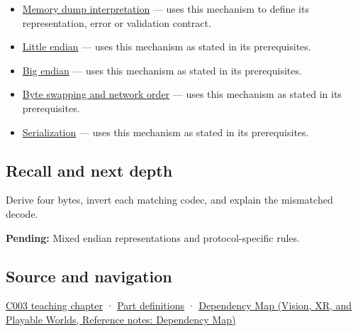 \hypertarget{appendix-bc07c3d25b18-used-by}{}

\begin{itemize}
\item
  \hyperref[appendix-230b59c0676b]{Memory dump interpretation} --- uses this mechanism to define its representation, error or validation contract.
\item
  \hyperref[appendix-367b6abf460e]{Little endian} --- uses this mechanism as stated in its prerequisites.
\item
  \hyperref[appendix-92e040df969a]{Big endian} --- uses this mechanism as stated in its prerequisites.
\item
  \hyperref[appendix-11ba36693aa2]{Byte swapping and network order} --- uses this mechanism as stated in its prerequisites.
\item
  \hyperref[appendix-91d09ebed979]{Serialization} --- uses this mechanism as stated in its prerequisites.
\end{itemize}

\subsection{Recall and next depth}\label{appendix-bc07c3d25b18-recall-and-next-depth}

\hypertarget{appendix-bc07c3d25b18-recall-and-next-depth}{}

Derive four bytes, invert each matching codec, and explain the mismatched decode.

\textbf{Pending:} Mixed endian representations and protocol-specific rules.

\subsection{Source and navigation}\label{appendix-bc07c3d25b18-source-and-navigation}

\hypertarget{appendix-bc07c3d25b18-source-and-navigation}{}

\hyperref[01-foundations-i-ch002-where-the-bytes-live]{C003 teaching chapter} · \hyperref[appendix-fd090d982a15-m003---parts-41-60]{Part definitions} · \href{../07-Vision-XR-and-Playable-Worlds/main.pdf\#nameddest=appendix-4ad47bdd269a}{Dependency Map (Vision, XR, and Playable Worlds, Reference notes: Dependency Map)}
